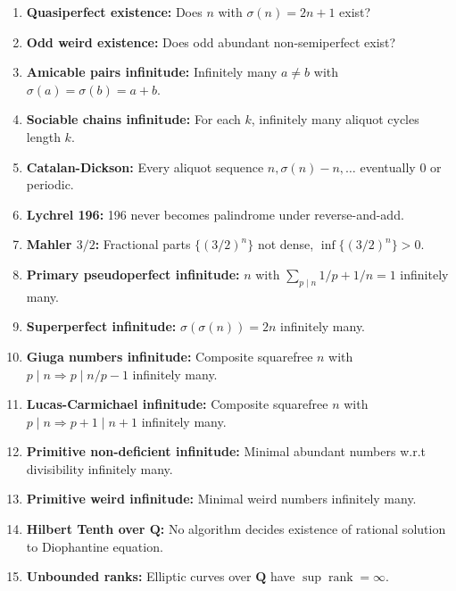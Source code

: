 \documentclass[aps,prd,amsmath,amssymb,twocolumn,superscriptaddress]{revtex4-2}
\begin{document}
\begin{enumerate}[label={\bf \arabic*.}, leftmargin=*, itemsep=2pt]
\item \textbf{Quasiperfect existence:} Does $n$ with $\sigma(n)=2n+1$ exist?

\item \textbf{Odd weird existence:} Does odd abundant non-semiperfect exist?

\item \textbf{Amicable pairs infinitude:} Infinitely many $a\neq b$ with $\sigma(a)=\sigma(b)=a+b$.

\item \textbf{Sociable chains infinitude:} For each $k$, infinitely many aliquot cycles length $k$.

\item \textbf{Catalan-Dickson:} Every aliquot sequence $n,\sigma(n)-n,\dots$ eventually $0$ or periodic.

\item \textbf{Lychrel 196:} 196 never becomes palindrome under reverse-and-add.

\item \textbf{Mahler $3/2$:} Fractional parts $\{(3/2)^n\}$ not dense, $\inf\{(3/2)^n\}>0$.

\item \textbf{Primary pseudoperfect infinitude:} $n$ with $\sum_{p\mid n}1/p+1/n=1$ infinitely many.

\item \textbf{Superperfect infinitude:} $\sigma(\sigma(n))=2n$ infinitely many.

\item \textbf{Giuga numbers infinitude:} Composite squarefree $n$ with $p\mid n\Rightarrow p\mid n/p-1$ infinitely many.

\item \textbf{Lucas-Carmichael infinitude:} Composite squarefree $n$ with $p\mid n\Rightarrow p+1\mid n+1$ infinitely many.

\item \textbf{Primitive non-deficient infinitude:} Minimal abundant numbers w.r.t divisibility infinitely many.

\item \textbf{Primitive weird infinitude:} Minimal weird numbers infinitely many.

\item \textbf{Hilbert Tenth over $\mathbf Q$:} No algorithm decides existence of rational solution to Diophantine equation.

\item \textbf{Unbounded ranks:} Elliptic curves over $\mathbf Q$ have $\sup\operatorname{rank}=\infty$.


\end{enumerate}
\end{document}
